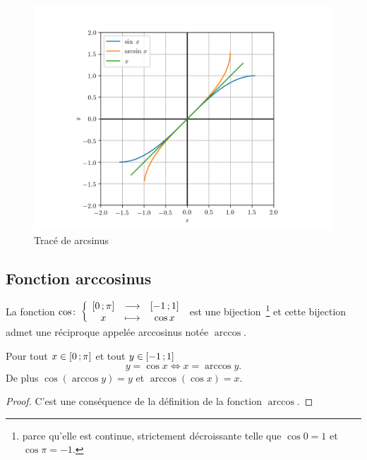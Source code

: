\begin{figure}
    \centering
    \includegraphics[scale = 0.8]{arcsin.png}
    \caption{Tracé de arcsinus}
    \label{fig:tracearcsinus}
\end{figure}

\subsection{Fonction arccosinus}
\label{subsec:chap1-fonctionarccos}

\begin{defdef}
    La fonction 
    \(\cos\colon \left\{\begin{array}{ccc} \left[ 0 \, ;  \pi \right] & \longrightarrow &\left[ -1 \, ;  1 \right]\\ x & \longmapsto & \cos x \end{array} \right.\) 
    est une bijection~\footnote{parce qu'elle est continue, strictement 
    décroissante telle que \(\cos 0 = 1\) et \(\cos \pi = -1\).} et cette bijection 
    admet une réciproque appelée arccosinus notée \(\arccos\).
\end{defdef}

\begin{prop}
    Pour tout \(x \in \left[ 0 \, ;  \pi \right]\) et tout \(y \in 
    \left[ -1 \, ;  1 \right]\)
    \begin{equation}
        y = \cos x \iff x = \arccos y.
    \end{equation}
    De plus \(\cos( \arccos y) = y\) et \(\arccos(\cos x) = x\).
\end{prop}

\begin{proof}
    C'est une conséquence de la définition de la fonction \(\arccos\).
\end{proof}

